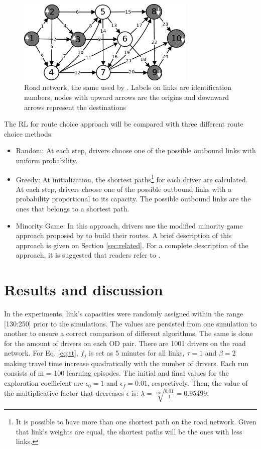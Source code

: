 \documentclass{RITA}
\newcommand{\fftt}{\ensuremath{f_j}} 		%
\begin{document}
\begin{figure}[ht]
    \centerline{\includegraphics[width=8.5cm]{img/roadnetwork.png}}
    \caption{Road network, the same used by \cite{Galib&Moser2011}. Labels on links are identification numbers, nodes with upward arrows are the origins and downward arrows represent the destinations}
    \label{fig:roadnetwork}
\end{figure}

The RL for route choice approach will be compared with three different route choice methods:

\begin{itemize}
  \item Random: At each step, drivers choose one of the possible outbound links with uniform probability.
  \item Greedy: At initialization, the shortest paths\footnote{It is possible to have more than one shortest path on the road network. Given that link's weights are equal, the shortest paths will be the ones with less links.} for each driver are calculated. At each step, drivers choose one of the possible outbound links with a probability proportional to its capacity. The possible outbound links are the ones that belongs to a shortest path. %
  \item Minority Game: In this approach, drivers use the modified minority game approach proposed by \cite{Galib&Moser2011} to build their routes. A brief description of this approach is given on Section \ref{sec:related}. For a complete description of the approach, it is suggested that readers refer to \cite{Galib&Moser2011}.
\end{itemize}

\section{Results and discussion}
\label{sec:results}

In the experiments, link's capacities were randomly assigned within the range [130:250] prior to the simulations. The values are persisted from one simulation to another to ensure a correct comparison of different algorithms. The same is done for the amount of drivers on each OD pair. There are 1001 drivers on the road network. For Eq. \eqref{eq:tt}, $\fftt$ is set as 5 minutes for all links, $\tau = 1$ and $\beta = 2$ making travel time increase quadratically with the number of drivers. Each run consists of m = 100 learning episodes. The initial and final values for the exploration coefficient are $\epsilon_0 = 1$ and $\epsilon_f = 0.01$, respectively. Then, the value of the multiplicative factor that decreases $\epsilon$ is: $\lambda = \sqrt[100]{\frac{0.01}{1}} = 0.95499$.
\end{document}
